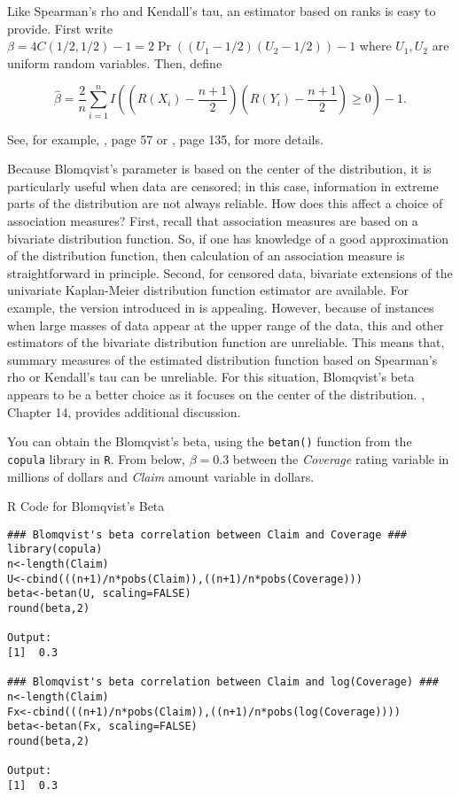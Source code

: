 \documentclass[]{book}
\theoremstyle{definition}
\theoremstyle{definition}
\theoremstyle{definition}
\theoremstyle{remark}
\begin{document}
Like Spearman's rho and Kendall's tau, an estimator based on ranks is
easy to provide. First write
\(\beta = 4C(1/2,1/2)-1 = 2\Pr((U_1-1/2)(U_2-1/2))-1\) where
\(U_1, U_2\) are uniform random variables. Then, define

\begin{equation*}
\hat{\beta} = \frac{2}{n} \sum_{i=1}^n I\left( (R(X_{i})-\frac{n+1}{2})(R(Y_{i})-\frac{n+1}{2}) \ge 0 \right)-1 .
\end{equation*}

See, for example, \citep{joe2014dependence}, page 57 or
\citep{hougaard2000analysis}, page 135, for more details.

Because Blomqvist's parameter is based on the center of the
distribution, it is particularly useful when data are censored; in this
case, information in extreme parts of the distribution are not always
reliable. How does this affect a choice of association measures? First,
recall that association measures are based on a bivariate distribution
function. So, if one has knowledge of a good approximation of the
distribution function, then calculation of an association measure is
straightforward in principle. Second, for censored data, bivariate
extensions of the univariate Kaplan-Meier distribution function
estimator are available. For example, the version introduced in
\citep{dabrowska1988kaplan} is appealing. However, because of instances
when large masses of data appear at the upper range of the data, this
and other estimators of the bivariate distribution function are
unreliable. This means that, summary measures of the estimated
distribution function based on Spearman's rho or Kendall's tau can be
unreliable. For this situation, Blomqvist's beta appears to be a better
choice as it focuses on the center of the distribution.
\citep{hougaard2000analysis}, Chapter 14, provides additional
discussion.

You can obtain the Blomqvist's beta, using the \texttt{betan()} function
from the \texttt{copula} library in \texttt{R}. From below,
\(\beta=0.3\) between the \emph{Coverage} rating variable in millions of
dollars and \emph{Claim} amount variable in dollars.

R Code for Blomqvist's Beta

\hypertarget{display.beta.2}{}
\begin{verbatim}
### Blomqvist's beta correlation between Claim and Coverage ###
library(copula)
n<-length(Claim)
U<-cbind(((n+1)/n*pobs(Claim)),((n+1)/n*pobs(Coverage)))
beta<-betan(U, scaling=FALSE)
round(beta,2)

Output:
[1]  0.3

### Blomqvist's beta correlation between Claim and log(Coverage) ###
n<-length(Claim)
Fx<-cbind(((n+1)/n*pobs(Claim)),((n+1)/n*pobs(log(Coverage))))
beta<-betan(Fx, scaling=FALSE)
round(beta,2)

Output:
[1]  0.3
\end{verbatim}
\end{document}

